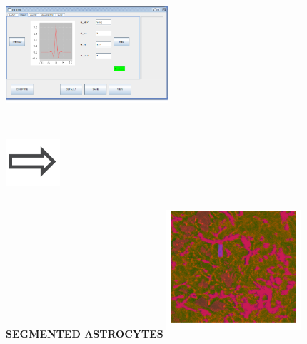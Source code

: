 \documentclass[portrait,final,a0paper]{baposter}
\begin{document}
\begin{poster}
{\begin{minipage}{.28\textwidth}
    	\newline
    	\newline
    	\includegraphics[width=6cm, height=5cm]{FilterScreen}
    	\newline		
    \end{minipage}
     \begin{minipage}{.10\textwidth}
     	\includegraphics[width=2cm, height=2cm]{arrow1}
     \end{minipage}
    \begin{minipage}{.25\textwidth}	
    	\color{Carnelian}\hspace{0.6cm}\textbf{SEGMENTED ASTROCYTES}
    	\newline
    	\newline
    	\includegraphics[width=5cm, height=5cm]{astrocyteresult}	
	
    \end{minipage}

}
\end{poster}
\end{document}
